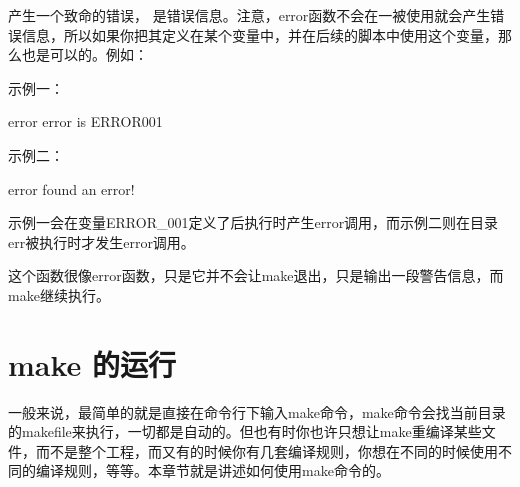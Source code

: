 \documentclass[a4paper,10pt]{sphinxmanual}
\begin{document}
\begin{sphinxVerbatim}[commandchars=\\\{\}]
 \PYGZlt{} \PYGZgt{}
\end{sphinxVerbatim}

产生一个致命的错误，  是错误信息。注意，error函数不会在一被使用就会产生错误信息，所以如果你把其定义在某个变量中，并在后续的脚本中使用这个变量，那么也是可以的。例如：

示例一：

\begin{sphinxVerbatim}[commandchars=\\\{\}]
    error error is ERROR\PYGZus{}001
\end{sphinxVerbatim}

示例二：

\begin{sphinxVerbatim}[commandchars=\\\{\}]
  error found an error!

 

 
\end{sphinxVerbatim}

示例一会在变量ERROR\_001定义了后执行时产生error调用，而示例二则在目录err被执行时才发生error调用。

\begin{sphinxVerbatim}[commandchars=\\\{\}]
 \PYGZlt{} \PYGZgt{}
\end{sphinxVerbatim}

这个函数很像error函数，只是它并不会让make退出，只是输出一段警告信息，而make继续执行。


\chapter{make 的运行}
\label{\detokenize{invoke:make}}\label{\detokenize{invoke::doc}}
一般来说，最简单的就是直接在命令行下输入make命令，make命令会找当前目录的makefile来执行，一切都是自动的。但也有时你也许只想让make重编译某些文件，而不是整个工程，而又有的时候你有几套编译规则，你想在不同的时候使用不同的编译规则，等等。本章节就是讲述如何使用make命令的。
\end{document}
